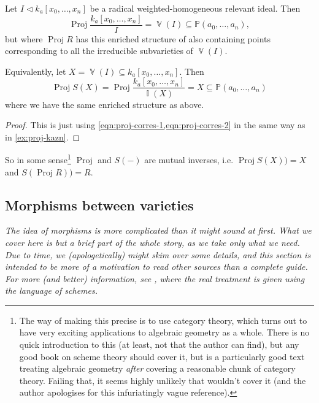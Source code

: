 \documentclass[10pt,notitlepage]{article}
\numberwithin{equation}{subsection}
\DeclareMathOperator{\proj}{Proj}
\DeclareMathOperator{\van}{\mathbb{V}}
\DeclareMathOperator{\ide}{\mathbb{I}}
\newcommand{\pee}{\mathbb{P}}
\newcommand{\kazn}{k_a[x_0,\ldots,x_n]}
\newcommand{\pazn}{\pee(a_0,\ldots,a_n)}
\newcommand{\blank}{{-}}
\begin{document}
    \begin{theorem}\label{thm:what-proj-means-for-quotients}
        Let $I\triangleleft\kazn$ be a radical weighted-homogeneous relevant ideal.
        Then
        \[
            \proj\frac{\kazn}{I} = \van(I) \subseteq \pazn,
        \]
        but where $\proj R$ has this enriched structure of also containing points corresponding to all the irreducible subvarieties of $\van(I)$.

        Equivalently, let $X=\van(I)\subseteq\kazn$.
        Then
        \[
            \proj S(X) = \proj\frac{\kazn}{\ide(X)} = X \subseteq \pazn
        \]
        where we have the same enriched structure as above.
    \end{theorem}

    \begin{proof}
        This is just using \cref{eqn:proj-corres-1,eqn:proj-corres-2} in the same way as in \cref{ex:proj-kazn}.
    \end{proof}

    So in some sense\footnote{%
        The way of making this precise is to use category theory, which turns out to have very exciting applications to algebraic geometry as a whole.
        There is no quick introduction to this (at least, not that the author can find), but any good book on scheme theory should cover it, but \cite{Vakil:2015wa} is a particularly good text treating algebraic geometry \emph{after} covering a reasonable chunk of category theory.
        Failing that, it seems highly unlikely that \cite{Hartshorne:1977we} wouldn't cover it (and the author apologises for this infuriatingly vague reference).
    } $\proj$ and $S(\blank)$ are mutual inverses, i.e. $\proj S(X)) = X$ and $S(\proj R)) = R$.




    \subsection{Morphisms between varieties} %
    \label{sub:morphisms_between_varieties}

    \emph{The idea of morphisms is more complicated than it might sound at first.
        What we cover here is but a brief part of the whole story, as we take only what we need.
        Due to time, we (apologetically) might skim over some details, and this section is intended to be more of a motivation to read other sources than a complete guide.
        For more (and better) information, see \cite[Chapter~II,~Section~2]{Hartshorne:1977we}, where the real treatment is given using the language of schemes.}
\end{document}
